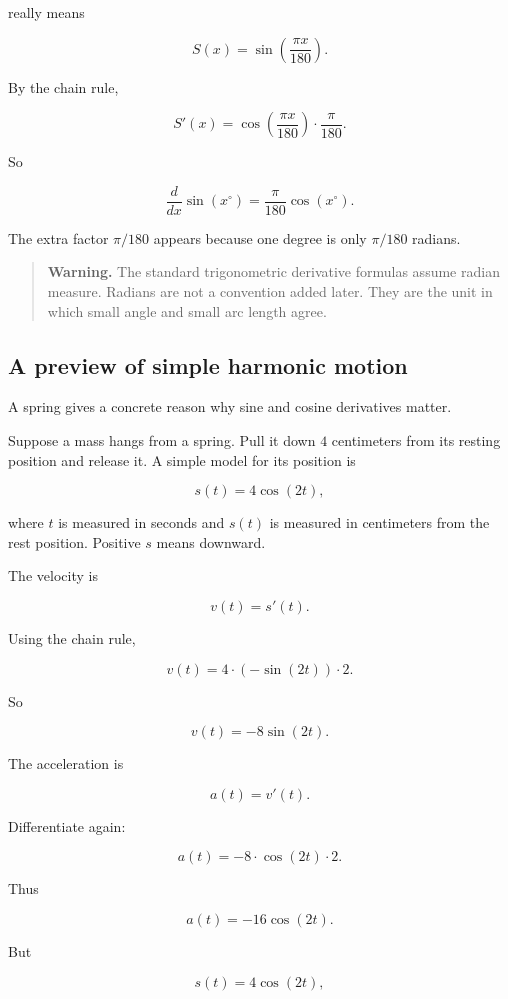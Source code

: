 really means

\[
S(x)=\sin\left(\frac{\pi x}{180}\right).
\]

By the chain rule,

\[
S'(x)
=
\cos\left(\frac{\pi x}{180}\right)\cdot\frac{\pi}{180}.
\]

So

\[
\boxed{
\frac{d}{dx}\sin(x^\circ)
=
\frac{\pi}{180}\cos(x^\circ).
}
\]

The extra factor \(\pi/180\) appears because one degree is only \(\pi/180\) radians.

\begin{quote}
\textbf{Warning.}
The standard trigonometric derivative formulas assume radian measure.  Radians are not a convention added later.  They are the unit in which small angle and small arc length agree.
\end{quote}

\subsection{A preview of simple harmonic motion}
\label{subsec:simple-harmonic-motion-preview}

A spring gives a concrete reason why sine and cosine derivatives matter.

Suppose a mass hangs from a spring.  Pull it down \(4\) centimeters from its resting position and release it.  A simple model for its position is

\[
s(t)=4\cos(2t),
\]

where \(t\) is measured in seconds and \(s(t)\) is measured in centimeters from the rest position.  Positive \(s\) means downward.

The velocity is

\[
v(t)=s'(t).
\]

Using the chain rule,

\[
v(t)=4\cdot(-\sin(2t))\cdot2.
\]

So

\[
\boxed{
v(t)=-8\sin(2t).
}
\]

The acceleration is

\[
a(t)=v'(t).
\]

Differentiate again:

\[
a(t)=-8\cdot\cos(2t)\cdot2.
\]

Thus

\[
a(t)=-16\cos(2t).
\]

But

\[
s(t)=4\cos(2t),
\]

